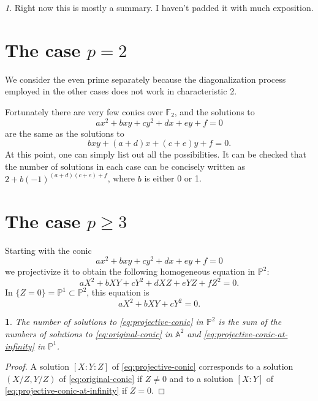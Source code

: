 \documentclass[10pt,a5paper]{amsart}
\numberwithin{equation}{section}
\numberwithin{figure}{section}
\theoremstyle{definition}
\theoremstyle{remark}
\newtheorem*{rem*}{\protect\remarkname}
\theoremstyle{plain}
\theoremstyle{plain}
\theoremstyle{definition}
\theoremstyle{plain}
\theoremstyle{plain}
\newtheorem{lem}{\protect\lemmaname}[section]
\providecommand{\lemmaname}{Lemma}
\providecommand{\remarkname}{Remark}
\begin{document}
\begin{rem*}
	Right now this is mostly a summary. I haven't padded it with much exposition.
\end{rem*}
\section{The case $p = 2$}
We consider the even prime separately because the diagonalization process employed in the other cases does not work in characteristic 2.

Fortunately there are very few conics over $\mathbb{F}_2$, and the solutions to
\[
	ax^2 + bxy + cy^2 + dx + ey + f = 0
\]
are the same as the solutions to
\[
	bxy + (a+d)x + (c+e)y + f = 0.
\]
At this point, one can simply list out all the possibilities. It can be checked that the number of solutions in each case can be concisely written as $2 + b(-1)^{(a+d)(c+e) + f}$, where $b$ is either 0 or 1.

\section{The case $p \geq 3$}
Starting with the conic
\begin{equation}\label{eq:original-conic}
	ax^2 + bxy + cy^2 + dx + ey + f = 0
\end{equation}
we projectivize it to obtain the following homogeneous equation in $\mathbb{P}^2$:
\begin{equation}\label{eq:projective-conic}
	aX^2 + bXY + cY^2 + dXZ + eYZ + fZ^2 = 0.
\end{equation}
In $\{Z=0\} = \mathbb{P}^1 \subset \mathbb{P}^2$, this equation is
\begin{equation}\label{eq:projective-conic-at-infinity}
	aX^2 + bXY + cY^2 = 0.
\end{equation}

\begin{lem}
	The number of solutions to \eqref{eq:projective-conic} in $\mathbb{P}^2$ is the sum of the numbers of solutions to \eqref{eq:original-conic} in $\mathbb{A}^2$ and \eqref{eq:projective-conic-at-infinity} in $\mathbb{P}^1$.
	
\end{lem}
\begin{proof}
	A solution $[X:Y:Z]$ of \eqref{eq:projective-conic} corresponds to a solution $(X/Z,Y/Z)$ of \eqref{eq:original-conic} if $Z \neq 0$ and to a solution $[X:Y]$ of \eqref{eq:projective-conic-at-infinity} if $Z=0$.
\end{proof}
\end{document}
